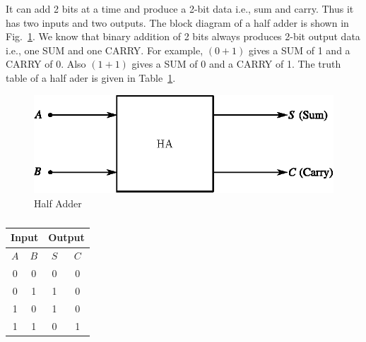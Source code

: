 It can add 2 bits at a time and produce a 2-bit data i.e., sum and carry. Thus it has two inputs and two outputs. The block diagram of a half adder is shown in Fig.~\ref{fig5.24}. We know that binary addition of 2 bits always produces 2-bit output data i.e., one SUM and one CARRY. For example, $(0+1)$ gives a SUM of 1 and a CARRY of 0. Also $(1+1)$ gives a SUM of 0 and a CARRY of 1. The truth table of a half ader is given in Table~\ref{tab5.16}.
\begin{figure}[H]
\centering
\includegraphics[scale=1.1]{chap5/fig5.17.eps}
\caption{Half Adder}\label{fig5.24}
\end{figure}
\begin{table}[H]
\centering
\caption{}\label{tab5.16}
\renewcommand{\arraystretch}{1.2}
\tabcolsep=10pt
\begin{tabular}{|cc|cc|}
\hline
\multicolumn{2}{|c|}{\bf Input} & \multicolumn{2}{c|}{\bf Output}\\
\hline
\boldmath$A$ & \boldmath$B$ & \boldmath$S$ & \boldmath$C$\\
\hline
0 & 0 & 0 & 0\\
0 & 1 & 1 & 0\\
1 & 0 & 1 & 0\\
1 & 1 & 0 & 1\\
\hline
\end{tabular}
\end{table}

